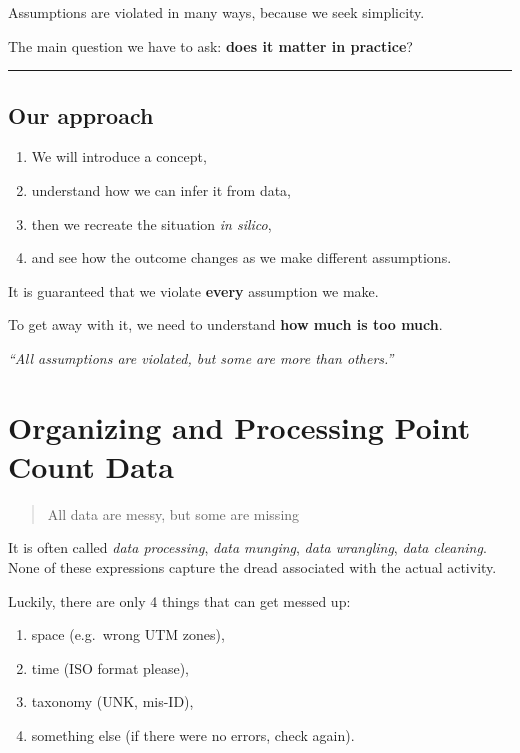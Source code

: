 \documentclass[12pt,]{scrbook}
\providecommand{\tightlist}{%
  \setlength{\itemsep}{0pt}\setlength{\parskip}{0pt}}
\begin{document}
Assumptions are violated in many ways, because we seek simplicity.

The main question we have to ask: \textbf{does it matter in practice}?

\begin{center}\rule{0.5\linewidth}{\linethickness}\end{center}

\hypertarget{our-approach}{%
\section{Our approach}\label{our-approach}}

\begin{enumerate}
\def\labelenumi{\arabic{enumi}.}
\tightlist
\item
  We will introduce a concept,
\item
  understand how we can infer it from data,
\item
  then we recreate the situation \emph{in silico},
\item
  and see how the outcome changes as we make different assumptions.
\end{enumerate}

It is guaranteed that we violate \textbf{every} assumption we make.

To get away with it, we need to understand \textbf{how much is too much}.

\emph{``All assumptions are violated, but some are more than others.''}

\hypertarget{pcdata}{%
\chapter{Organizing and Processing Point Count Data}\label{pcdata}}

\begin{quote}
All data are messy, but some are missing
\end{quote}

It is often called \emph{data processing}, \emph{data munging},
\emph{data wrangling}, \emph{data cleaning}.
None of these expressions capture the dread associated with the actual activity.

Luckily, there are only 4 things that can get messed up:

\begin{enumerate}
\def\labelenumi{\arabic{enumi}.}
\tightlist
\item
  space (e.g.~wrong UTM zones),
\item
  time (ISO format please),
\item
  taxonomy (UNK, mis-ID),
\item
  something else (if there were no errors, check again).
\end{enumerate}
\end{document}
